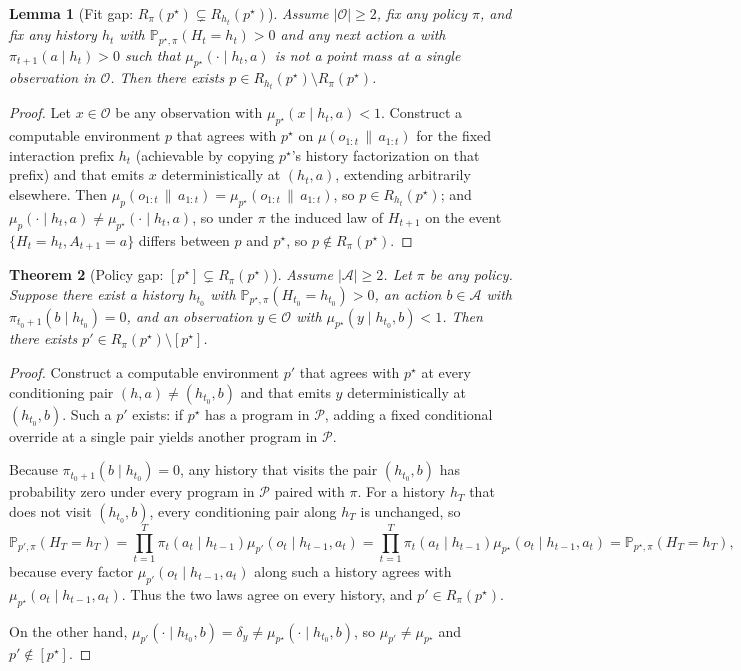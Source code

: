 \documentclass[11pt]{article}
\newtheorem{theorem}{Theorem}[section]
\newtheorem{lemma}[theorem]{Lemma}
\theoremstyle{definition}
\theoremstyle{remark}
\newcommand{\Acal}{\mathcal{A}}
\newcommand{\Ocal}{\mathcal{O}}
\newcommand{\Pcal}{\mathcal{P}}
\newcommand{\Prob}{\mathbb{P}}
\newcommand{\givena}{\,\|\,}
\begin{document}
\begin{lemma}[{Fit gap: $R_\pi(p^\star)\subsetneq R_{h_t}(p^\star)$}]
\label{lem:fit-gap}
Assume $|\Ocal|\ge 2$, fix any policy $\pi$, and fix any history $h_t$ with $\Prob_{p^\star,\pi}(H_t=h_t)>0$ and any next action $a$ with $\pi_{t+1}(a\mid h_t)>0$ such that $\mu_{p^\star}(\cdot\mid h_t,a)$ is not a point mass at a single observation in $\Ocal$. Then there exists $p\in R_{h_t}(p^\star)\setminus R_\pi(p^\star)$.
\end{lemma}

\begin{proof}
Let $x\in\Ocal$ be any observation with $\mu_{p^\star}(x\mid h_t,a)<1$. Construct a computable environment $p$ that agrees with $p^\star$ on $\mu(o_{1:t}\givena a_{1:t})$ for the fixed interaction prefix $h_t$ (achievable by copying $p^\star$'s history factorization on that prefix) and that emits $x$ deterministically at $(h_t,a)$, extending arbitrarily elsewhere. Then $\mu_p(o_{1:t}\givena a_{1:t})=\mu_{p^\star}(o_{1:t}\givena a_{1:t})$, so $p\in R_{h_t}(p^\star)$; and $\mu_p(\cdot\mid h_t,a)\neq \mu_{p^\star}(\cdot\mid h_t,a)$, so under $\pi$ the induced law of $H_{t+1}$ on the event $\{H_t=h_t,A_{t+1}=a\}$ differs between $p$ and $p^\star$, so $p\notin R_\pi(p^\star)$.
\end{proof}

\begin{theorem}[{Policy gap: $[p^\star]\subsetneq R_\pi(p^\star)$}]
\label{thm:policy-gap}
Assume $|\Acal|\ge 2$. Let $\pi$ be any policy. Suppose there exist a history $h_{t_0}$ with $\Prob_{p^\star,\pi}(H_{t_0}=h_{t_0})>0$, an action $b\in\Acal$ with $\pi_{t_0+1}(b\mid h_{t_0})=0$, and an observation $y\in\Ocal$ with $\mu_{p^\star}(y\mid h_{t_0},b)<1$. Then there exists $p'\in R_\pi(p^\star)\setminus [p^\star]$.
\end{theorem}

\begin{proof}
Construct a computable environment $p'$ that agrees with $p^\star$ at every conditioning pair $(h,a)\neq(h_{t_0},b)$ and that emits $y$ deterministically at $(h_{t_0},b)$. Such a $p'$ exists: if $p^\star$ has a program in $\Pcal$, adding a fixed conditional override at a single pair yields another program in $\Pcal$.

Because $\pi_{t_0+1}(b\mid h_{t_0})=0$, any history that visits the pair $(h_{t_0},b)$ has probability zero under every program in $\Pcal$ paired with $\pi$. For a history $h_T$ that does not visit $(h_{t_0},b)$, every conditioning pair along $h_T$ is unchanged, so
\[
\Prob_{p',\pi}(H_T=h_T)
=
\prod_{t=1}^T \pi_t(a_t\mid h_{t-1})\mu_{p'}(o_t\mid h_{t-1},a_t)
=
\prod_{t=1}^T \pi_t(a_t\mid h_{t-1})\mu_{p^\star}(o_t\mid h_{t-1},a_t)
=
\Prob_{p^\star,\pi}(H_T=h_T),
\]
because every factor $\mu_{p'}(o_t\mid h_{t-1},a_t)$ along such a history agrees with $\mu_{p^\star}(o_t\mid h_{t-1},a_t)$. Thus the two laws agree on every history, and $p'\in R_\pi(p^\star)$.

On the other hand, $\mu_{p'}(\cdot\mid h_{t_0},b)=\delta_y\neq \mu_{p^\star}(\cdot\mid h_{t_0},b)$, so $\mu_{p'}\neq\mu_{p^\star}$ and $p'\notin [p^\star]$.
\end{proof}
\end{document}
